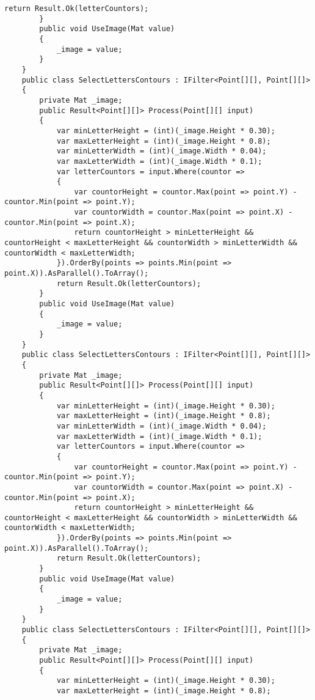 \begin{lstlisting}[style=fsharpstyle,caption={Исходный код}, label=lst:recognition_result_handler]
            return Result.Ok(letterCountors);
        }
        public void UseImage(Mat value)
        {
            _image = value;
        }
    }
    public class SelectLettersContours : IFilter<Point[][], Point[][]>
    {
        private Mat _image;
        public Result<Point[][]> Process(Point[][] input)
        {
            var minLetterHeight = (int)(_image.Height * 0.30);
            var maxLetterHeight = (int)(_image.Height * 0.8);
            var minLetterWidth = (int)(_image.Width * 0.04);
            var maxLetterWidth = (int)(_image.Width * 0.1);
            var letterCountors = input.Where(countor =>
            {
                var countorHeight = countor.Max(point => point.Y) - countor.Min(point => point.Y);
                var countorWidth = countor.Max(point => point.X) - countor.Min(point => point.X);
                return countorHeight > minLetterHeight && countorHeight < maxLetterHeight && countorWidth > minLetterWidth && countorWidth < maxLetterWidth;
            }).OrderBy(points => points.Min(point => point.X)).AsParallel().ToArray();
            return Result.Ok(letterCountors);
        }
        public void UseImage(Mat value)
        {
            _image = value;
        }
    }
    public class SelectLettersContours : IFilter<Point[][], Point[][]>
    {
        private Mat _image;
        public Result<Point[][]> Process(Point[][] input)
        {
            var minLetterHeight = (int)(_image.Height * 0.30);
            var maxLetterHeight = (int)(_image.Height * 0.8);
            var minLetterWidth = (int)(_image.Width * 0.04);
            var maxLetterWidth = (int)(_image.Width * 0.1);
            var letterCountors = input.Where(countor =>
            {
                var countorHeight = countor.Max(point => point.Y) - countor.Min(point => point.Y);
                var countorWidth = countor.Max(point => point.X) - countor.Min(point => point.X);
                return countorHeight > minLetterHeight && countorHeight < maxLetterHeight && countorWidth > minLetterWidth && countorWidth < maxLetterWidth;
            }).OrderBy(points => points.Min(point => point.X)).AsParallel().ToArray();
            return Result.Ok(letterCountors);
        }
        public void UseImage(Mat value)
        {
            _image = value;
        }
    }
    public class SelectLettersContours : IFilter<Point[][], Point[][]>
    {
        private Mat _image;
        public Result<Point[][]> Process(Point[][] input)
        {
            var minLetterHeight = (int)(_image.Height * 0.30);
            var maxLetterHeight = (int)(_image.Height * 0.8);

\end{lstlisting}
